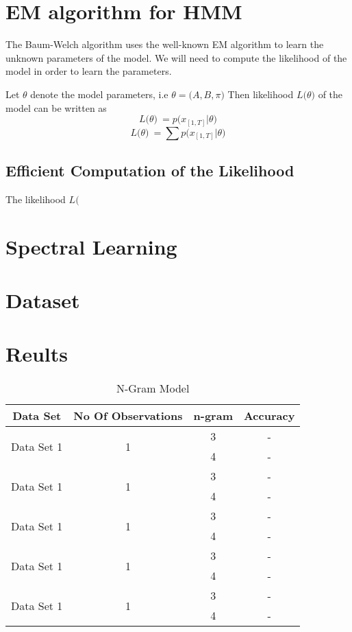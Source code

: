 \documentclass{article} %
\begin{document}
\section{EM algorithm for HMM}
\label{EM algorithm}
The Baum-Welch algorithm uses the well-known EM algorithm to learn the unknown parameters of the model. We will need to compute the likelihood of the model in order to learn the parameters.

Let $\theta$ denote the model parameters, i.e \( \theta = \big(A,B,\pi\big) \)
Then likelihood \(L\big(\theta\big)\) of the model can be written as 
\[L\big(\theta \big)\ = p\big(x_{[1,T]}|\theta \big) \]
\[L\big(\theta \big)\ = \sum p\big(x_{[1,T]}|\theta \big) \]



\subsection{Efficient Computation of the Likelihood}
The likelihood \(L(\)

\section{Spectral Learning}
\label{Spectral Learning}

\section{Dataset}

\section{Reults}

\begin{table}[t]
\caption{N-Gram Model}
\label{N-Gram_model}
\begin{center}
\begin{tabular}{ |c|c|c|c| }
\hline
\multicolumn{1}{|c|}{\bf Data Set} &\multicolumn{1}{|c|}{\bf No Of Observations} &\multicolumn{1}{|c|}{\bf n-gram} &\multicolumn{1}{|c|}{\bf Accuracy}\\
\hline
\multirow{2}{*}{Data Set 1}& \multirow{2}{*}{1} & 3 & - \\
& & 4 & - \\
\hline
\multirow{2}{*}{Data Set 1}& \multirow{2}{*}{1} & 3 & - \\
& & 4 & - \\
\hline
\multirow{2}{*}{Data Set 1}& \multirow{2}{*}{1} & 3 & - \\
& & 4 & - \\
\hline
\multirow{2}{*}{Data Set 1}& \multirow{2}{*}{1} & 3 & - \\
& & 4 & - \\
\hline
\multirow{2}{*}{Data Set 1}& \multirow{2}{*}{1} & 3 & - \\
& & 4 & - \\
\hline
\end{tabular}
\end{center}
\end{table}
\end{document}
